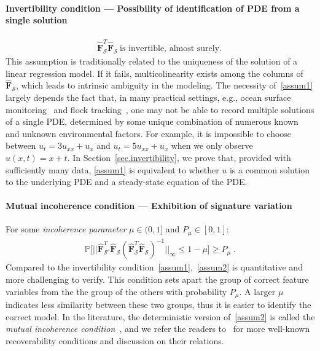 \documentclass[a4paper,11pt]{article}
\newcommand{\bF}{\mathbf{F}}
\newcommand{\mS}{\mathcal{S}}
\theoremstyle{definition}
\begin{document}
\paragraph{Invertibility condition --- Possibility of identification of PDE from a single solution}
\begin{align}
\widehat{\bF}_{\mS}^T\widehat{\bF}_\mS~\text{is invertible, almost surely.}~\label{assum1}\tag{A1}
\end{align}
This assumption is traditionally related to the uniqueness of the solution of a linear regression model. If it fails, multicolinearity exists among the columns of $\widehat{\bF}_\mS$, which leads to intrinsic ambiguity in the modeling. The necessity of~\eqref{assum1} largely depends the fact that, in many practical settings, e.g., ocean surface monitoring~\cite{fox2001monitoring} and flock tracking~\cite{michele2016radar}, one may not be able to record multiple solutions of a single PDE, determined by some unique combination of numerous known and unknown environmental factors. For example, it is impossible to choose between $u_t=3u_{xx}+u_x$ and $u_t = 5u_{xx}+u_x$ when we only observe $u(x,t)=x+t$. In Section~\ref{sec.invertibility}, we prove that, provided with sufficiently many data, \eqref{assum1} is equivalent to whether $u$ is a common solution to the underlying PDE and a steady-state equation of the PDE.

\paragraph{Mutual incoherence condition --- Exhibition of signature variation} For some \textit{incoherence parameter} $\mu\in (0,1]$ and $P_\mu\in [0,1]$:
\begin{align}
\mathbb{P}\big[||\widehat{\bF}_{\mS^c}^T\widehat{\bF}_\mS(\widehat{\bF}_{\mS}^T\widehat{\bF}_\mS)^{-1}||_\infty\leq 1-\mu\big]\geq P_\mu\;.\label{assum2}\tag{A2}
\end{align}
Compared to the invertibility condition~\eqref{assum1},~\eqref{assum2} is  quantitative and more challenging to verify. This condition sets apart the group of correct feature variables from the the group of the others with probability $P_\mu$. A larger $\mu$ indicates less similarity between these two groups, thus it is easier to identify the correct model. In the literature, the deterministic version of~\eqref{assum2} is called the \textit{mutual incoherence condition}~\cite{fuchs2005recovery, tropp2006just,wainwright2009sharp}, and we refer the readers to~\cite{van2009conditions} for more well-known recoverability conditions and discussion on their relations.
\end{document}
